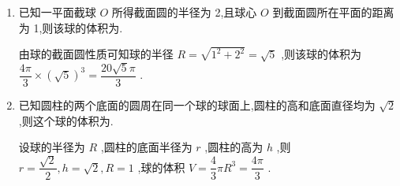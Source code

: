 \begin{enumerate}
    \item 已知一平面截球 $O$ 所得截面圆的半径为 2,且球心 $O$ 到截面圆所在平面的距离为 1,则该球的体积为.
    \begin{jieda}
        由球的截面圆性质可知球的半径 $R = \sqrt{{1}^{2} + {2}^{2}} = \sqrt{5}$ ,则该球的体积为 $\dfrac{4\pi }{3} \times  {\left( \sqrt{5}\right) }^{3} = \dfrac{{20}\sqrt{5}\pi }{3}$ .
    \end{jieda}
    
    \item 已知圆柱的两个底面的圆周在同一个球的球面上,圆柱的高和底面直径均为 $\sqrt{2}$ ,则这个球的体积为.
    \begin{jieda}
        设球的半径为 $R$ ,圆柱的底面半径为 $r$ ,圆柱的高为 $h$ ,则 $r = \dfrac{\sqrt{2}}{2},h = \sqrt{2},R = 1$ ,球的体积 $V = \dfrac{4}{3}\pi {R}^{3} = \dfrac{4\pi }{3}$ .
    \end{jieda}

\end{enumerate}
